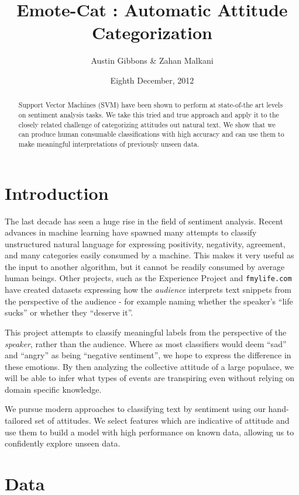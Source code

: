 \documentclass[11pt]{article}
\title{Emote-Cat : Automatic Attitude Categorization}
\author{Austin Gibbons \& Zahan Malkani}
\date{Eighth December, 2012}
\begin{document}
\maketitle

\begin{abstract}
Support Vector Machines (SVM) have been shown to perform at state-of-the art levels on sentiment analysis tasks. We take this tried and true approach and apply it to the closely related challenge of categorizing attitudes out natural text. We show that we can produce human consumable classifications with high accuracy and can use them to make meaningful interpretations of previously unseen data.
\end{abstract}

\section{Introduction}

The last decade has seen a huge rise in the field of sentiment analysis. Recent advances in machine learning have spawned many attempts to classify unstructured natural language for expressing positivity, negativity, agreement, and many categories easily consumed by a machine. This makes it very useful as the input to another algorithm, but it cannot be readily consumed by average human beings. Other projects, such as the Experience Project and \verb|fmylife.com| have created datasets expressing how the \emph{audience} interprets text snippets from the perspective of the audience - for example naming whether the speaker's ``life sucks'' or whether they ``deserve it''. 

This project attempts to classify meaningful labels from the perspective of the \emph{speaker}, rather than the audience. Where as most classifiers would deem ``sad'' and ``angry'' as being ``negative sentiment'', we hope to express the difference in these emotions. By then analyzing the collective attitude of a large populace, we will be able to infer what types of events are transpiring even without relying on domain specific knowledge.

We pursue modern approaches to classifying text by sentiment using our hand-tailored set of attitudes. We select features which are indicative of attitude and use them to build a model with high performance on known data, allowing us to confidently explore unseen data.

\section{Data}
\end{document}
